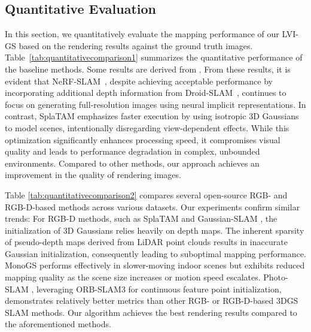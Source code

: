 \documentclass[lettersize,journal]{IEEEtran}
\begin{document}
\subsection{Quantitative Evaluation}
\label{subsec:quantitativeevaluation}
In this section, we quantitatively evaluate the mapping performance of our LVI-GS based on the rendering results against the ground truth images.
Table~\ref{tab:quantitativecomparison1} summarizes the quantitative performance of the baseline methods. 
Some results are derived from \cite{gaussianlic}. From these results, it is evident that NeRF-SLAM~\cite{nerfslam}, despite achieving acceptable performance by incorporating additional depth information from Droid-SLAM~\cite{droidslam}, continues to focus on generating full-resolution images using neural implicit representations. In contrast, SplaTAM \cite{splatam} emphasizes faster execution by using isotropic 3D Gaussians to model scenes, intentionally disregarding view-dependent effects. While this optimization significantly enhances processing speed, it compromises visual quality and leads to performance degradation in complex, unbounded environments. Compared to other methods, our approach achieves an improvement in the quality of rendering images.

Table \ref{tab:quantitativecomparison2} compares several open-source RGB- and RGB-D-based methods across various datasets. Our experiments confirm similar trends: For RGB-D methods, such as SplaTAM \cite{splatam} and Gaussian-SLAM \cite{gaussianslam}, the initialization of 3D Gaussians relies heavily on depth maps. The inherent sparsity of pseudo-depth maps derived from LiDAR point clouds results in inaccurate Gaussian initialization, consequently leading to suboptimal mapping performance. MonoGS performs effectively in slower-moving indoor scenes but exhibits reduced mapping quality as the scene size increases or motion speed escalates. Photo-SLAM \cite{photoslam}, leveraging ORB-SLAM3 \cite{orbslam3} for continuous feature point initialization, demonstrates relatively better metrics than other RGB- or RGB-D-based 3DGS SLAM methods. Our algorithm achieves the best rendering results compared to the aforementioned methods.
\end{document}
